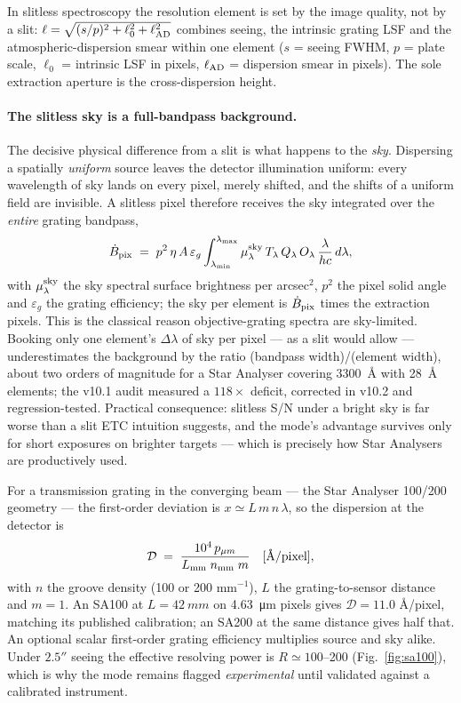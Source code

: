 In slitless spectroscopy the resolution element is set by the image quality,
not by a slit: $\ell = \sqrt{(s/p)^2 + \ell_0^2 + \ell_{\rm AD}^2}$ combines
seeing, the intrinsic grating LSF and the atmospheric-dispersion smear
within one element ($s$ = seeing FWHM, $p$ = plate scale, $\ell_0$ =
intrinsic LSF in pixels, $\ell_{\rm AD}$ = dispersion smear in pixels).
The sole extraction aperture is the cross-dispersion height.

\paragraph{The slitless sky is a full-bandpass background.} The decisive
physical difference from a slit is what happens to the \emph{sky}.
Dispersing a spatially \emph{uniform} source leaves the detector
illumination uniform: every wavelength of sky lands on every pixel,
merely shifted, and the shifts of a uniform field are invisible. A
slitless pixel therefore receives the sky integrated over the
\emph{entire} grating bandpass,
\begin{equation}
  \dot B_{\rm pix} \;=\; p^2\, \eta\, A\, \varepsilon_g
  \int_{\lambda_{\rm min}}^{\lambda_{\rm max}}
  \mu_\lambda^{\rm sky}\, T_\lambda\, Q_\lambda\, O_\lambda\,
  \frac{\lambda}{hc}\, d\lambda ,
  \label{eq:slitless-sky}
\end{equation}
with $\mu_\lambda^{\rm sky}$ the sky spectral surface brightness per
arcsec$^2$, $p^2$ the pixel solid angle and $\varepsilon_g$ the grating
efficiency; the sky per element is $\dot B_{\rm pix}$ times the
extraction pixels. This is the classical reason objective-grating spectra
are sky-limited. Booking only one element's $\Delta\lambda$ of sky per
pixel — as a slit would allow — underestimates the background by the
ratio (bandpass width)/(element width), about two orders of magnitude for
a Star Analyser covering \SI{3300}{\angstrom} with \SI{28}{\angstrom}
elements; the v10.1 audit measured a $118\times$ deficit, corrected in
v10.2 and regression-tested. Practical consequence: slitless S/N under a
bright sky is far worse than a slit ETC intuition suggests, and the
mode's advantage survives only for short exposures on brighter targets —
which is precisely how Star Analysers are productively used.

For a transmission grating in the converging beam --- the Star Analyser
100/200 geometry --- the first-order deviation is
$x \simeq L\,m\,n\,\lambda$, so the dispersion at the detector is
\begin{equation}
  \mathcal{D} \;=\; \frac{10^{4}\, p_{\mu m}}{L_{\rm mm}\; n_{\rm mm}\; m}
  \quad [\si{\angstrom}/\text{pixel}],
  \label{eq:sa}
\end{equation}
with $n$ the groove density (100 or 200 mm$^{-1}$), $L$ the
grating-to-sensor distance and $m=1$. An SA100 at $L=\SI{42}{mm}$ on
\SI{4.63}{\micro\metre} pixels gives $\mathcal{D} = 11.0$
\si{\angstrom}/pixel, matching its published calibration; an SA200 at the
same distance gives half that. An optional scalar first-order grating
efficiency multiplies source and sky alike. Under $2.5''$ seeing the
effective resolving power is $R \simeq 100$--200
(Fig.~\ref{fig:sa100}), which is why the mode remains flagged
\emph{experimental} until validated against a calibrated instrument.

